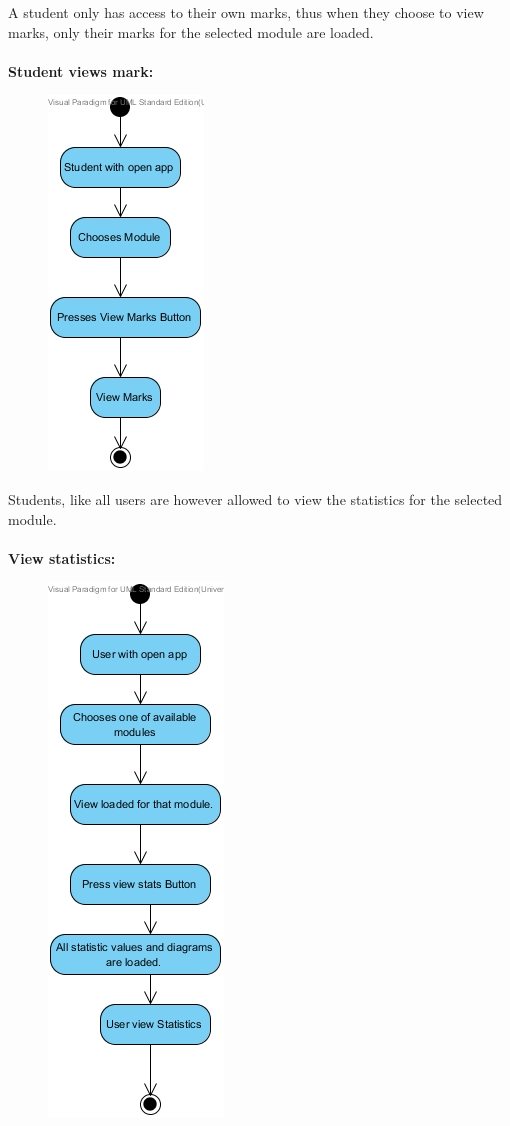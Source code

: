 \documentclass[12pt,a4paper]{article}
\begin{document}
A student only has access to their own marks, thus when they choose to view marks, only their marks for the selected module are loaded. \\
\\
\textbf {Student views mark:}
\begin{figure}[h]
\begin{center}
\includegraphics[scale=0.8]{./AndroidActivityDiagrams/ActivityDiagram2}
\end{center}
\end{figure} 

Students, like all users are however allowed to view the statistics for the selected module. \\
\\
\textbf {View statistics:}
\begin{figure}[h]
\begin{center}
\includegraphics[scale=0.7]{./AndroidActivityDiagrams/ActivityDiagram3}
\end{center}
\end{figure}  
\end{document}
